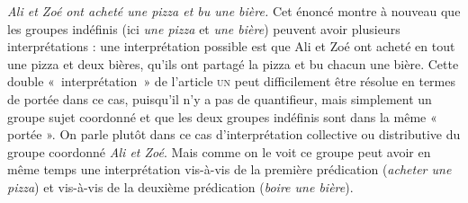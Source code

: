 {\ea\label{ex:13-pizza} \textit{Ali et Zoé ont acheté une pizza et bu une bière.}\z
Cet énoncé montre à nouveau que les groupes indéfinis (ici \textit{une pizza} et \textit{une bière}) peuvent avoir plusieurs interprétations : une interprétation possible est que Ali et Zoé ont acheté en tout une pizza et deux bières, qu’ils ont partagé la pizza et bu chacun une bière. Cette double «~interprétation~» de l’article \textsc{un} peut difficilement être résolue en termes de portée dans ce cas, puisqu’il n’y a pas de quantifieur, mais simplement un groupe sujet coordonné et que les deux groupes indéfinis sont dans la même « portée ». On parle plutôt dans ce cas d’interprétation collective ou distributive du groupe coordonné \textit{Ali et Zoé}. Mais comme on le voit ce groupe peut avoir en même temps une interprétation  vis-à-vis de la première prédication (\textit{acheter une pizza}) et  vis-à-vis de la deuxième prédication (\textit{boire une bière}).

}
